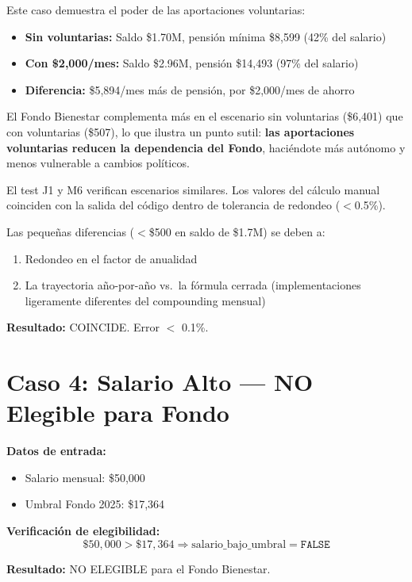 \documentclass[11pt,a4paper]{report}
\begin{document}
\begin{tcolorbox}[colback=green!5!white, colframe=green!50!black, title=\textbf{Intuici\'on}]
Este caso demuestra el poder de las aportaciones voluntarias:
\begin{itemize}
  \item \textbf{Sin voluntarias:} Saldo \$1.70M, pensi\'on m\'inima \$8,599 (42\% del salario)
  \item \textbf{Con \$2,000/mes:} Saldo \$2.96M, pensi\'on \$14,493 (97\% del salario)
  \item \textbf{Diferencia:} \$5,894/mes m\'as de pensi\'on, por \$2,000/mes de ahorro
\end{itemize}

El Fondo Bienestar complementa m\'as en el escenario sin voluntarias (\$6,401) que con voluntarias (\$507), lo que ilustra un punto sutil: \textbf{las aportaciones voluntarias reducen la dependencia del Fondo}, haci\'endote m\'as aut\'onomo y menos vulnerable a cambios pol\'iticos.
\end{tcolorbox}

\begin{tcolorbox}[colback=orange!5!white, colframe=orange!75!black, title=\textbf{Aplicaci\'on en C\'odigo: Verificaci\'on}]
El test J1 y M6 verifican escenarios similares. Los valores del c\'alculo manual coinciden con la salida del c\'odigo dentro de tolerancia de redondeo ($<$0.5\%).

Las peque\~nas diferencias ($<$\$500 en saldo de \$1.7M) se deben a:
\begin{enumerate}
  \item Redondeo en el factor de anualidad
  \item La trayectoria a\~no-por-a\~no vs.\ la f\'ormula cerrada (implementaciones ligeramente diferentes del compounding mensual)
\end{enumerate}

\textbf{Resultado:} COINCIDE. Error $<$ 0.1\%.
\end{tcolorbox}


\section{Caso 4: Salario Alto --- NO Elegible para Fondo}

\begin{tcolorbox}[colback=blue!5!white, colframe=blue!75!black, title=\textbf{Definici\'on Formal}]
\textbf{Datos de entrada:}
\begin{itemize}
  \item Salario mensual: \$50,000
  \item Umbral Fondo 2025: \$17,364
\end{itemize}

\textbf{Verificaci\'on de elegibilidad:}
\[
  \$50,000 > \$17,364 \Rightarrow \text{salario\_bajo\_umbral} = \texttt{FALSE}
\]

\textbf{Resultado:} NO ELEGIBLE para el Fondo Bienestar.
\end{tcolorbox}
\end{document}

